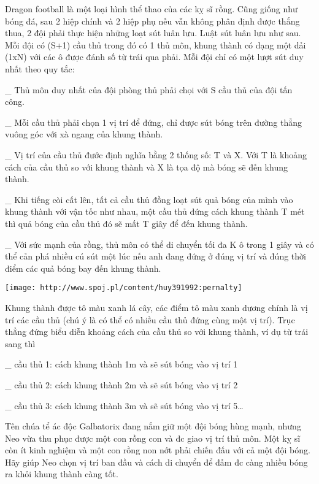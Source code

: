 



   Dragon football là một loại hình thể thao của các kỵ sĩ rồng. Cũng giống như bóng đá, sau 2 hiệp chính và 2 hiệp phụ nếu vẫn không phân định được thắng thua, 2 đội phải thực hiện những loạt sút luân lưu. Luật sút luân lưu như sau. Mỗi đội có (S+1) cầu thủ trong đó có 1 thủ môn, khung thành có dạng một dải (1xN) với các ô được đánh số từ trái qua phải. Mỗi đội chỉ có một lượt sút duy nhất theo quy tắc:   


   \_ Thủ môn duy nhất của đội phòng thủ phải chọi với S cầu thủ của đội tấn công.   


   \_ Mỗi cầu thủ phải chọn 1 vị trí để đứng, chỉ được sút bóng trên đường thẳng vuông góc với xà ngang của khung thành.   


   \_ Vị trí của cầu thủ đước định nghĩa bằng 2 thống số: T và X. Với T là khoảng cách của cầu thủ so với khung thành và X là tọa độ mà bóng sẽ đến khung thành.   


   \_ Khi tiếng còi cất lên, tất cả cầu thủ đồng loạt sút quả bóng của mình vào khung thành với vận tốc như nhau, một cầu thủ đứng cách khung thành T mét thì quả bóng của cầu thủ đó sẽ mất T giây để đến khung thành.   


   \_ Với sức mạnh của rồng, thủ môn có thể di chuyển tối đa K ô trong 1 giây và có thể cản phá nhiều cú sút một lúc nếu anh đang đứng ở đúng vị trí và đúng thời điểm các quả bóng bay đến khung thành.   



\texttt{[image: http://www.spoj.pl/content/huy391992:pernalty]}


   Khung thành được tô màu xanh lá cây, các điểm tô màu xanh dương chính là vị trí các cầu thủ (chú ý là có thể có nhiều cầu thủ đứng cùng một vị trí). Trục thẳng đứng biểu diễn khoảng cách của cầu thủ so với khung thành, ví dụ từ trái sang thì   


   \_ cầu thủ 1: cách khung thành 1m và sẽ sút bóng vào vị trí 1   


   \_ cầu thủ 2: cách khung thành 2m và sẽ sút bóng vào vị trí 2   


   \_ cầu thủ 3: cách khung thành 3m và sẽ sút bóng vào vị trí 5…   


   Tên chúa tể ác độc Galbatorix đang nắm giữ một đội bóng hùng mạnh, nhưng Neo vừa thu phục được một con rồng con và đc giao vị trí thủ môn. Một kỵ sĩ còn ít kinh nghiệm và một con rồng non nớt phải chiến đấu với cả một đội bóng. Hãy giúp Neo chọn vị trí ban đầu và cách di chuyển để đấm đc càng nhiều bóng ra khỏi khung thành càng tốt.  

